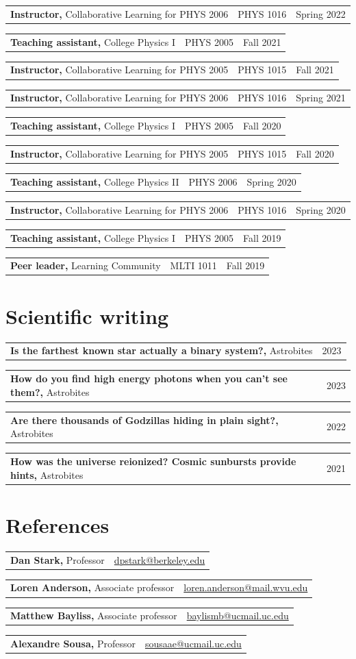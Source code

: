 \documentclass[11pt]{article}
\makeatletter
\newcommand{\teaching}[5]{
    {
    \noindent
    \begin{tabularx}{\textwidth}{@{} X rr @{}}
        \textbf{#1,} {\color{gray}\fontseries{normal}\selectfont #2}\newline {\color{gray}\fontseries{bold}\selectfont #5} & #3 & #4 \\
    \end{tabularx}
    \addvspace{0.1cm}
    }
}
\newcommand{\writing}[4]{
    {
    \noindent
    \begin{tabularx}{\textwidth}{@{} X r @{}}
        \textbf{#1,} {\color{gray}\fontseries{normal}\selectfont #2}\newline {\fontseries{normal}\selectfont #4} & #3 \\
    \end{tabularx}
    \addvspace{0.1cm}
    }
}
\newcommand{\reference}[4]{
    \noindent
    \begin{tabularx}{\textwidth}{@{} X r @{}}
        \textbf{#1,} {\color{gray}\fontseries{normal}\selectfont #2}\newline {\color{gray}\fontseries{bold}\selectfont #3} & \href{mailto:#4}{#4} \\
    \end{tabularx}
    \addvspace{0.1cm}
}
\makeatother
\begin{document}
\teaching{Instructor}{Collaborative Learning for PHYS 2006}{PHYS 1016}{Spring 2022}{University of Cincinnati}

\teaching{Teaching assistant}{College Physics I}{PHYS 2005}{Fall 2021}{University of Cincinnati}

\teaching{Instructor}{Collaborative Learning for PHYS 2005}{PHYS 1015}{Fall 2021}{University of Cincinnati}

\teaching{Instructor}{Collaborative Learning for PHYS 2006}{PHYS 1016}{Spring 2021}{University of Cincinnati}

\teaching{Teaching assistant}{College Physics I}{PHYS 2005}{Fall 2020}{University of Cincinnati}

\teaching{Instructor}{Collaborative Learning for PHYS 2005}{PHYS 1015}{Fall 2020}{University of Cincinnati}

\teaching{Teaching assistant}{College Physics II}{PHYS 2006}{Spring 2020}{University of Cincinnati}

\teaching{Instructor}{Collaborative Learning for PHYS 2006}{PHYS 1016}{Spring 2020}{University of Cincinnati}

\teaching{Teaching assistant}{College Physics I}{PHYS 2005}{Fall 2019}{University of Cincinnati}

\teaching{Peer leader}{Learning Community}{MLTI 1011}{Fall 2019}{University of Cincinnati}

\section{Scientific writing}

\writing{Is the farthest known star actually a binary system?}{Astrobites}{2023}{\textbf{R. Owens}}

\writing{How do you find high energy photons when you can't see them?}{Astrobites}{2023}{\textbf{R. Owens}}

\writing{Are there thousands of Godzillas hiding in plain sight?}{Astrobites}{2022}{\textbf{R. Owens}}

\writing{How was the universe reionized? Cosmic sunbursts provide hints}{Astrobites}{2021}{\textbf{R. Owens}}

\section{References}

\reference{Dan Stark}{Professor}{University of California, Berkeley}{dpstark@berkeley.edu}

\reference{Loren Anderson}{Associate professor}{West Virginia University}{loren.anderson@mail.wvu.edu}

\reference{Matthew Bayliss}{Associate professor}{University of Cincinnati}{baylismb@ucmail.uc.edu}

\reference{Alexandre Sousa}{Professor}{University of Cincinnati}{sousaae@ucmail.uc.edu}
\end{document}

